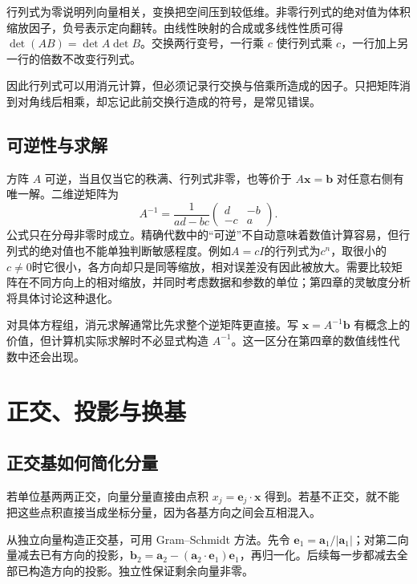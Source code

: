 \documentclass[11pt,openany,fontset=fandol]{ctexbook}
\theoremstyle{plain}\newtheorem{theorem}{定理}[chapter]\newtheorem{proposition}[theorem]{命题}
\theoremstyle{definition}\newtheorem{definition}{定义}[chapter]\newtheorem{example}{例}[chapter]
\theoremstyle{remark}\newtheorem*{remark}{说明}
\newcommand{\vct}[1]{\bm{#1}}\newcommand{\Rea}{\operatorname{Re}}\newcommand{\Ima}{\operatorname{Im}}
\begin{document}
行列式为零说明列向量相关，变换把空间压到较低维。非零行列式的绝对值为体积缩放因子，负号表示定向翻转。由线性映射的合成或多线性性质可得 $\det(AB)=\det A\det B$。交换两行变号，一行乘 $c$ 使行列式乘 $c$，一行加上另一行的倍数不改变行列式。

因此行列式可以用消元计算，但必须记录行交换与倍乘所造成的因子。只把矩阵消到对角线后相乘，却忘记此前交换行造成的符号，是常见错误。

\subsection{可逆性与求解}
方阵 $A$ 可逆，当且仅当它的秩满、行列式非零，也等价于 $A\vct x=\vct b$ 对任意右侧有唯一解。二维逆矩阵为
\begin{equation}
A^{-1}=\frac1{ad-bc}\begin{pmatrix}d&-b\\-c&a\end{pmatrix}.
\end{equation}
公式只在分母非零时成立。精确代数中的“可逆”不自动意味着数值计算容易，但行列式的绝对值也不能单独判断敏感程度。例如$A=cI$的行列式为$c^n$，取很小的$c\ne0$时它很小，各方向却只是同等缩放，相对误差没有因此被放大。需要比较矩阵在不同方向上的相对缩放，并同时考虑数据和参数的单位；第四章的灵敏度分析将具体讨论这种退化。

对具体方程组，消元求解通常比先求整个逆矩阵更直接。写 $\vct x=A^{-1}\vct b$ 有概念上的价值，但计算机实际求解时不必显式构造 $A^{-1}$。这一区分在第四章的数值线性代数中还会出现。

\section{正交、投影与换基}
\subsection{正交基如何简化分量}
若单位基两两正交，向量分量直接由点积 $x_j=\vct e_j\cdot\vct x$ 得到。若基不正交，就不能把这些点积直接当成坐标分量，因为各基方向之间会互相混入。

从独立向量构造正交基，可用 Gram--Schmidt 方法。先令 $\vct e_1=\vct a_1/|\vct a_1|$；对第二向量减去已有方向的投影，$\vct b_2=\vct a_2-(\vct a_2\cdot\vct e_1)\vct e_1$，再归一化。后续每一步都减去全部已构造方向的投影。独立性保证剩余向量非零。
\end{document}
